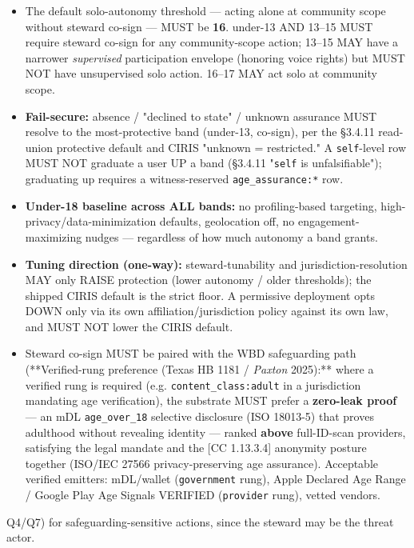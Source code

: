 \documentclass[11pt]{article}
\begin{document}
\begin{itemize}\setlength\itemsep{0pt}
\item The default solo-autonomy threshold — acting alone at community scope without steward co-sign — MUST be \textbf{16}. under-13 AND 13–15 MUST require steward co-sign for any community-scope action; 13–15 MAY have a narrower \textit{supervised} participation envelope (honoring voice rights) but MUST NOT have unsupervised solo action. 16–17 MAY act solo at community scope.
\item \textbf{Fail-secure:} absence / "declined to state" / unknown assurance MUST resolve to the most-protective band (under-13, co-sign), per the §3.4.11 read-union protective default and CIRIS "unknown = restricted." A \texttt{self}-level row MUST NOT graduate a user UP a band (§3.4.11 "\texttt{self} is unfalsifiable"); graduating up requires a witness-reserved \texttt{age\_assurance:*} row.
\item \textbf{Under-18 baseline across ALL bands:} no profiling-based targeting, high-privacy/data-minimization defaults, geolocation off, no engagement-maximizing nudges — regardless of how much autonomy a band grants.
\item \textbf{Tuning direction (one-way):} steward-tunability and jurisdiction-resolution MAY only RAISE protection (lower autonomy / older thresholds); the shipped CIRIS default is the strict floor. A permissive deployment opts DOWN only via its own affiliation/jurisdiction policy against its own law, and MUST NOT lower the CIRIS default.
\item Steward co-sign MUST be paired with the WBD safeguarding path (**Verified-rung preference (Texas HB 1181 / \textit{Paxton} 2025):** where a verified rung is required (e.g. \texttt{content\_class:adult} in a jurisdiction mandating age verification), the substrate MUST prefer a \textbf{zero-leak proof} — an mDL \texttt{age\_over\_18} selective disclosure (ISO 18013-5) that proves adulthood without revealing identity — ranked \textbf{above} full-ID-scan providers, satisfying the legal mandate and the [CC 1.13.3.4] anonymity posture together (ISO/IEC 27566 privacy-preserving age assurance). Acceptable verified emitters: mDL/wallet (\texttt{government} rung), Apple Declared Age Range / Google Play Age Signals VERIFIED (\texttt{provider} rung), vetted vendors.
\end{itemize}


Q4/Q7) for safeguarding-sensitive actions, since the steward may be the threat actor.
\end{document}
